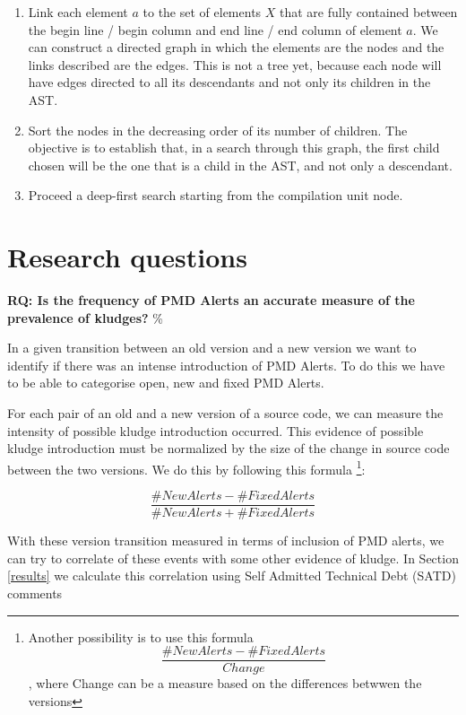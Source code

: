 \documentclass[
]{article}
\begin{document}
\begin{enumerate}
\item
  Link each element \(a\) to the set of elements \(X\) that are fully
  contained between the begin line / begin column and end line / end
  column of element \(a\). We can construct a directed graph in which
  the elements are the nodes and the links described are the edges. This
  is not a tree yet, because each node will have edges directed to all
  its descendants and not only its children in the AST.

\item
  Sort the nodes in the decreasing order of its number of children. The
  objective is to establish that, in a search through this graph, the
  first child chosen will be the one that is a child in the AST, and not
  only a descendant.

\item
  Proceed a deep-first search starting from the compilation unit node.
\end{enumerate}

\section{Research questions}
\label{as_whole}

\noindent
\textbf{RQ: Is the frequency of PMD Alerts an accurate measure of the prevalence of kludges?}
\%\label{PMD_Kludge}

In a given transition between an old version and a new version we want
to identify if there was an intense introduction of PMD Alerts. To do
this we have to be able to categorise open, new and fixed PMD Alerts.

For each pair of an old and a new version of a source code, we can
measure the intensity of possible kludge introduction occurred. This
evidence of possible kludge introduction must be normalized by the size
of the change in source code between the two versions. We do this by
following this formula
\footnote{Another possibility is to use this formula \[ \frac{\#NewAlerts - \#FixedAlerts}{Change}    \], where Change can be a measure based on the differences betwwen the versions}:

\[ \frac{\#NewAlerts - \#FixedAlerts}{\#NewAlerts + \#FixedAlerts}    \]

With these version transition measured in terms of inclusion of PMD
alerts, we can try to correlate of these events with some other evidence
of kludge. In Section \ref{results} we calculate this correlation using
Self Admitted Technical Debt (SATD) comments
\end{document}
